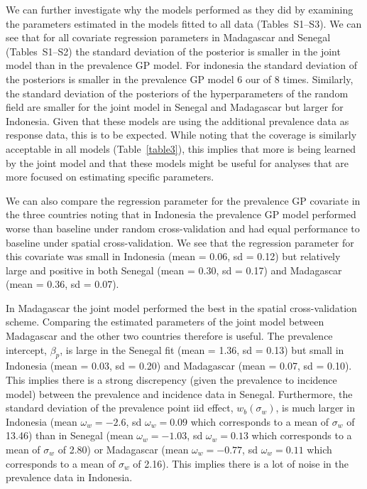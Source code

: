 \documentclass{statsoc}
\begin{document}

We can further investigate why the models performed as they did by examining the parameters estimated in the models fitted to all data (Tables~S1--S3).
We can see that for all covariate regression parameters in Madagascar and Senegal (Tables~S1--S2) the standard deviation of the posterior is smaller in the joint model than in the prevalence GP model.
For indonesia the standard deviation of the posteriors is smaller in the prevalence GP model 6 our of 8 times.
Similarly, the standard deviation of the posteriors of the hyperparameters of the random field are smaller for the joint model in Senegal and Madagascar but larger for Indonesia.
Given that these models are using the additional prevalence data as response data, this is to be expected.
While noting that the coverage is similarly acceptable in all models (Table~\ref{table3}), this implies that more is being learned by the joint model and that these models might be useful for analyses that are more focused on estimating specific parameters.


We can also compare the regression parameter for the prevalence GP covariate in the three countries noting that in Indonesia the prevalence GP model performed worse than baseline under random cross-validation and had equal performance to baseline under spatial cross-validation.
We see that the regression parameter for this covariate was small in Indonesia (mean = 0.06, sd = 0.12) but relatively large and positive in both Senegal (mean = 0.30, sd = 0.17) and Madagascar  (mean = 0.36, sd = 0.07).

In Madagascar the joint model performed the best in the spatial cross-validation scheme. 
Comparing the estimated parameters of the joint model between Madagascar and the other two countries therefore is useful.
The prevalence intercept, $\beta_p$, is large in the Senegal fit (mean = 1.36, sd = 0.13) but small in Indonesia (mean = 0.03, sd = 0.20) and Madagascar (mean = 0.07, sd = 0.10).
This implies there is a strong discrepency (given the prevalence to incidence model) between the prevalence and incidence data in Senegal.
Furthermore, the standard deviation of the prevalence point iid effect, $w_b(\sigma_w)$, is much larger in Indonesia (mean $\omega_w = -2.6$, sd $\omega_w = 0.09$ which corresponds to a mean of $\sigma_w$ of 13.46) than in Senegal (mean $\omega_w = -1.03$, sd $\omega_w = 0.13$ which corresponds to a mean of $\sigma_w$ of 2.80) or Madagascar (mean $\omega_w = -0.77$, sd $\omega_w = 0.11$ which corresponds to a mean of $\sigma_w$ of 2.16).
This implies there is a lot of noise in the prevalence data in Indonesia.
\end{document}
